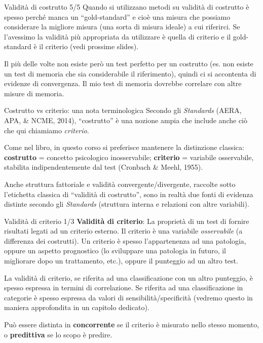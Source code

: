 \documentclass[
  ignorenonframetext,
  aspectratio=169,
]{beamer}
\begin{document}
\begin{frame}{Validità di costrutto 5/5}
\label{validituxe0-di-costrutto-55}
Quando si utilizzano metodi su validità di costrutto è spesso perché
manca un ``gold-standard'' e cioè una misura che possiamo considerare la
migliore misura (una sorta di misura ideale) a cui riferirci. Se
l'avessimo la validità più appropriata da utilizzare è quella di
criterio e il gold-standard è il criterio (vedi prossime slides).

Il più delle volte non esiste però un test perfetto per un costrutto
(es. non esiste un test di memoria che sia considerabile il
riferimento), quindi ci si accontenta di evidenze di convergenza. Il mio
test di memoria dovrebbe correlare con altre misure di memoria.
\end{frame}

\begin{frame}{Costrutto vs criterio: una nota terminologica}
\label{costrutto-vs-criterio-una-nota-terminologica}
Secondo gli \emph{Standards} (AERA, APA, \& NCME, 2014), ``costrutto'' è
una nozione ampia che include anche ciò che qui chiamiamo
\emph{criterio}.

Come nel libro, in questo corso si preferisce mantenere la distinzione
classica: \textbf{costrutto} = concetto psicologico inosservabile;
\textbf{criterio} = variabile osservabile, stabilita indipendentemente
dal test (Cronbach \& Meehl, 1955).

\vfill

Anche struttura fattoriale e validità convergente/divergente, raccolte
sotto l'etichetta classica di ``validità di costrutto'', sono in realtà
due fonti di evidenza distinte secondo gli \emph{Standards} (struttura
interna e relazioni con altre variabili).
\end{frame}

\begin{frame}{Validità di criterio 1/3}
\label{validituxe0-di-criterio-13}
\textbf{Validità di criterio}: La proprietà di un test di fornire
risultati legati ad un criterio esterno. Il criterio è una variabile
\emph{osservabile} (a differenza dei costrutti). Un criterio è spesso
l'appartenenza ad una patologia, oppure un aspetto prognostico (lo
sviluppare una patologia in futuro, il migliorare dopo un trattamento,
etc.), oppure il punteggio ad un altro test.

La validità di criterio, se riferita ad una classificazione con un altro
punteggio, è spesso espressa in termini di correlazione. Se riferita ad
una classificazione in categorie è spesso espressa da valori di
sensibilità/specificità (vedremo questo in maniera approfondita in un
capitolo dedicato).

Può essere distinta in \textbf{concorrente} se il criterio è misurato
nello stesso momento, o \textbf{predittiva} se lo scopo è predire.
\end{frame}
\end{document}
